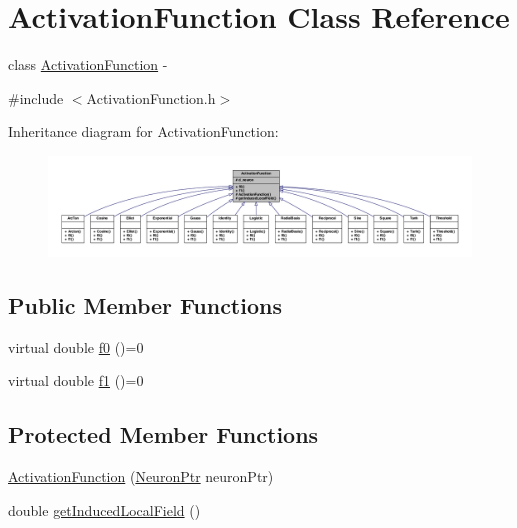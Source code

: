 \hypertarget{class_activation_function}{
\section{ActivationFunction Class Reference}
\label{class_activation_function}
}


class \hyperlink{class_activation_function}{ActivationFunction} -\/  




{\ttfamily \#include $<$ActivationFunction.h$>$}



Inheritance diagram for ActivationFunction:\nopagebreak
\begin{figure}[H]
\begin{center}
\leavevmode
\includegraphics[width=400pt]{class_activation_function__inherit__graph}
\end{center}
\end{figure}
\subsection*{Public Member Functions}
\begin{DoxyCompactItemize}
\item 
virtual double \hyperlink{class_activation_function_a801deb6a372121fe110de1f79f93f1c6}{f0} ()=0
\item 
virtual double \hyperlink{class_activation_function_aa5a0a713bc1080ab5d5ae3632a08b08e}{f1} ()=0
\end{DoxyCompactItemize}
\subsection*{Protected Member Functions}
\begin{DoxyCompactItemize}
\item 
\hyperlink{class_activation_function_aebbc56ae5a7ff79e5d843034f6d7dc4f}{ActivationFunction} (\hyperlink{_a_m_o_r_e_8h_ac1ea936c2c7728eb382278131652fef4}{NeuronPtr} neuronPtr)
\item 
double \hyperlink{class_activation_function_a72f5e70051e79c0e19318ba1b9bb77ec}{getInducedLocalField} ()
\end{DoxyCompactItemize}
